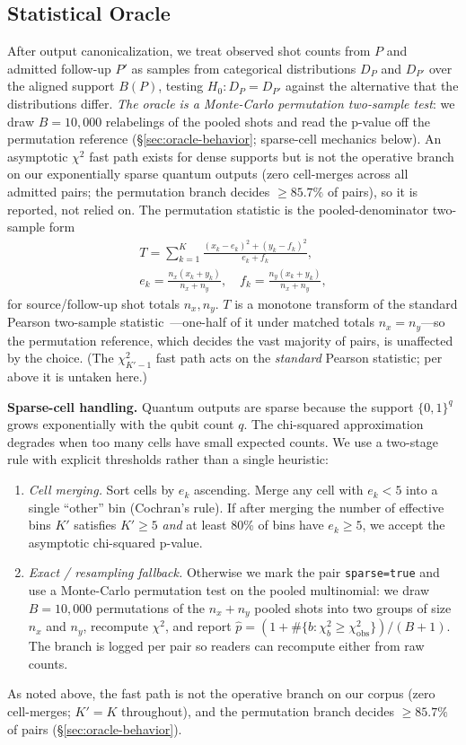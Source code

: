 \subsection{Statistical Oracle}
\label{sec:statistical-oracle}

After output canonicalization, we treat observed shot counts from $P$ and admitted follow-up $P'$ as samples from categorical distributions $D_P$ and $D_{P'}$ over the aligned support $B(P)$, testing $H_0: D_P = D_{P'}$ against the alternative that the distributions differ. \emph{The oracle is a Monte-Carlo permutation two-sample test}: we draw $B=10{,}000$ relabelings of the pooled shots and read the p-value off the permutation reference (\S\ref{sec:oracle-behavior}; sparse-cell mechanics below). An asymptotic $\chi^2$ fast path exists for dense supports but is not the operative branch on our exponentially sparse quantum outputs (zero cell-merges across all admitted pairs; the permutation branch decides $\geq 85.7\%$ of pairs), so it is reported, not relied on. The permutation statistic is the pooled-denominator two-sample form
\[
\begin{gathered}
T = \sum_{k=1}^{K} \frac{(x_k - e_k)^2 + (y_k - f_k)^2}{e_k + f_k},\\[2pt]
e_k=\tfrac{n_x(x_k+y_k)}{n_x+n_y},\quad f_k=\tfrac{n_y(x_k+y_k)}{n_x+n_y},
\end{gathered}
\]
for source/follow-up shot totals $n_x, n_y$. $T$ is a monotone transform of the standard Pearson two-sample statistic~\cite{pearson1900criterion}---one-half of it under matched totals $n_x=n_y$---so the permutation reference, which decides the vast majority of pairs, is unaffected by the choice. (The $\chi^2_{K'-1}$ fast path acts on the \emph{standard} Pearson statistic; per above it is untaken here.)

\noindent\textbf{Sparse-cell handling.}
Quantum outputs are sparse because the support $\{0,1\}^q$ grows exponentially with the qubit count $q$. The chi-squared approximation degrades when too many cells have small expected counts. We use a two-stage rule with explicit thresholds rather than a single heuristic:
\begin{enumerate}
  \item \emph{Cell merging.} Sort cells by $e_k$ ascending. Merge any cell with $e_k<5$ into a single ``other'' bin (Cochran's rule). If after merging the number of effective bins $K'$ satisfies $K'\geq 5$ \emph{and} at least 80\% of bins have $e_k\geq 5$, we accept the asymptotic chi-squared p-value.
  \item \emph{Exact / resampling fallback.} Otherwise we mark the pair \texttt{sparse=true} and use a Monte-Carlo permutation test on the pooled multinomial: we draw $B=10{,}000$ permutations of the $n_x+n_y$ pooled shots into two groups of size $n_x$ and $n_y$, recompute $\chi^2$, and report $\hat{p} = (1+\#\{b: \chi^2_b \geq \chi^2_{\mathrm{obs}}\})/(B+1)$. The branch is logged per pair so readers can recompute either from raw counts.
\end{enumerate}
As noted above, the fast path is not the operative branch on our corpus (zero cell-merges; $K'=K$ throughout), and the permutation branch decides $\geq 85.7\%$ of pairs (\S\ref{sec:oracle-behavior}).

